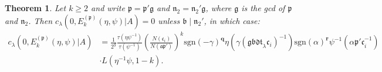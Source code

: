 \documentclass[a4paper,oneside]{amsart}
\theoremstyle{plain}
\newtheorem{thm}{Theorem}[section]
\theoremstyle{definition}
\begin{document}
\begin{thm}  Let $k\geq 2$ and write $\mathfrak{p} = \mathfrak{p'}\mathfrak{g}$ and $\mathfrak{n}_2 = \mathfrak{n}_2'\mathfrak{g}$, where $\mathfrak{g}$ is the gcd of $\mathfrak{p}$ and $\mathfrak{n}_2$. Then $c_{\lambda}(0,E_k^{(\mathfrak{p})}(\eta,\psi)|A) = 0$ unless $\mathfrak{b}\mid\mathfrak{n}_2'$, in which case: \begin{align*}c_{\lambda}(0,E_k^{(\mathfrak{p})}(\eta,\psi)|A) &= \frac{1}{2^g}\frac{\tau(\eta\psi^{-1})}{\tau(\psi^{-1})}\left(\frac{N(\mathfrak{c}_i)}{N(\mathfrak{ap'})}\right)^k\text{sgn}(-\gamma)^{\textbf{q}}\eta(\gamma(\mathfrak{gbdt}_{\lambda}\mathfrak{c}_i)^{-1})\text{sgn}(\alpha)^{\textbf{r}}\psi^{-1}(\alpha\mathfrak{p'c}_i^{-1})\\ &\cdot L(\eta^{-1}\psi,1-k).\end{align*}
\end{thm}
\end{document}
